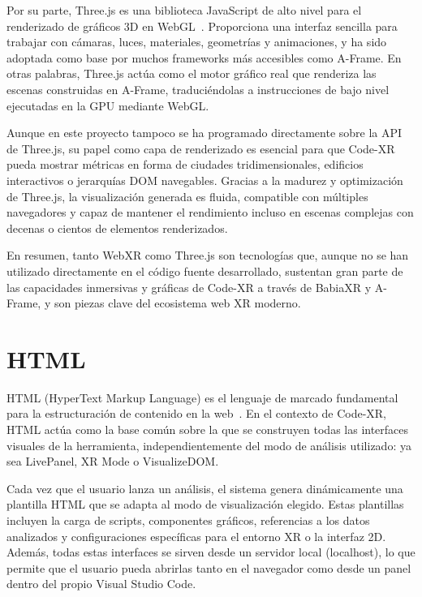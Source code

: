 \documentclass[a4paper, 12pt]{book}
\begin{document}
Por su parte, Three.js es una biblioteca JavaScript de alto nivel para el renderizado de gráficos 3D en WebGL~\cite{threejs}. Proporciona una interfaz sencilla para trabajar con cámaras, luces, materiales, geometrías y animaciones, y ha sido adoptada como base por muchos frameworks más accesibles como A-Frame. En otras palabras, Three.js actúa como el motor gráfico real que renderiza las escenas construidas en A-Frame, traduciéndolas a instrucciones de bajo nivel ejecutadas en la GPU mediante WebGL.

Aunque en este proyecto tampoco se ha programado directamente sobre la API de Three.js, su papel como capa de renderizado es esencial para que Code-XR pueda mostrar métricas en forma de ciudades tridimensionales, edificios interactivos o jerarquías DOM navegables. Gracias a la madurez y optimización de Three.js, la visualización generada es fluida, compatible con múltiples navegadores y capaz de mantener el rendimiento incluso en escenas complejas con decenas o cientos de elementos renderizados.

En resumen, tanto WebXR como Three.js son tecnologías que, aunque no se han utilizado directamente en el código fuente desarrollado, sustentan gran parte de las capacidades inmersivas y gráficas de Code-XR a través de BabiaXR y A-Frame, y son piezas clave del ecosistema web XR moderno.


\section{HTML}
\label{sec:html}

HTML (HyperText Markup Language) es el lenguaje de marcado fundamental para la estructuración de contenido en la web~\cite{html}. En el contexto de Code-XR, HTML actúa como la base común sobre la que se construyen todas las interfaces visuales de la herramienta, independientemente del modo de análisis utilizado: ya sea LivePanel, XR Mode o VisualizeDOM.

Cada vez que el usuario lanza un análisis, el sistema genera dinámicamente una plantilla HTML que se adapta al modo de visualización elegido. Estas plantillas incluyen la carga de scripts, componentes gráficos, referencias a los datos analizados y configuraciones específicas para el entorno XR o la interfaz 2D. Además, todas estas interfaces se sirven desde un servidor local (localhost), lo que permite que el usuario pueda abrirlas tanto en el navegador como desde un panel dentro del propio Visual Studio Code.
\end{document}
